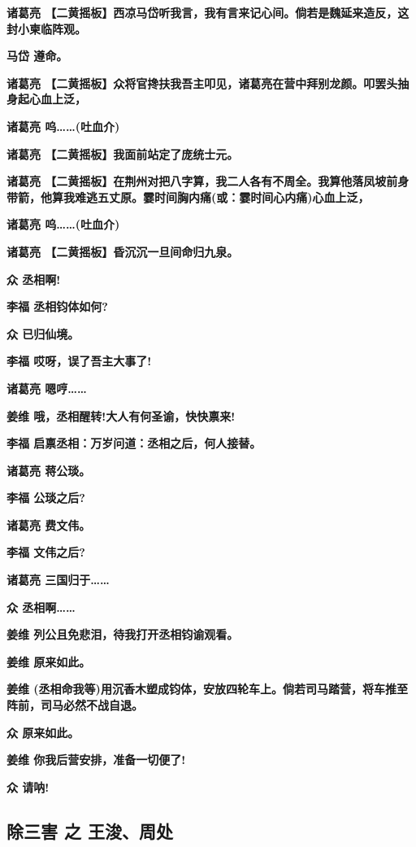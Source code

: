 \textbf{诸葛亮
【二黄摇板】西凉马岱听我言，我有言来记心间。倘若是魏延来造反，这封小柬临阵观。}

\textbf{马岱 遵命。}

\textbf{诸葛亮
【二黄摇板】众将官搀扶我吾主叩见，诸葛亮在营中拜别龙颜。叩罢头抽身起心血上泛，}

\textbf{诸葛亮 呜\ldots{}\ldots{}(吐血介)}

\textbf{诸葛亮 【二黄摇板】我面前站定了庞统士元。}

\textbf{诸葛亮
【二黄摇板】在荆州对把八字算，我二人各有不周全。我算他落凤坡前身带箭，他算我难逃五丈原。霎时间胸内痛(或：霎时间心内痛)心血上泛，}

\textbf{诸葛亮 呜\ldots{}\ldots{}(吐血介)}

\textbf{诸葛亮 【二黄摇板】昏沉沉一旦间命归九泉。}

\textbf{众 丞相啊!}

\textbf{李福 丞相钧体如何?}

\textbf{众 已归仙境。}

\textbf{李福 哎呀，误了吾主大事了!}

\textbf{诸葛亮 嗯哼\ldots{}\ldots{}}

\textbf{姜维 哦，丞相醒转!大人有何圣谕，快快禀来!}

\textbf{李福 启禀丞相：万岁问道：丞相之后，何人接替。}

\textbf{诸葛亮 蒋公琰。}

\textbf{李福 公琰之后?}

\textbf{诸葛亮 费文伟。}

\textbf{李福 文伟之后?}

\textbf{诸葛亮 三国归于\ldots{}\ldots{}}

\textbf{众 丞相啊\ldots{}\ldots{}}

\textbf{姜维 列公且免悲泪，待我打开丞相钧谕观看。}

\textbf{姜维 原来如此。}

\textbf{姜维
(丞相命我等)用沉香木塑成钧体，安放四轮车上。倘若司马踏营，将车推至阵前，司马必然不战自退。}

\textbf{众 原来如此。}

\textbf{姜维 你我后营安排，准备一切便了!}

\textbf{众 请呐!}

\hypertarget{ux9664ux4e09ux5bb3-ux4e4b-ux738bux6d5aux5468ux5904}{%
\subsection{除三害 之
王浚、周处}\label{ux9664ux4e09ux5bb3-ux4e4b-ux738bux6d5aux5468ux5904}}

